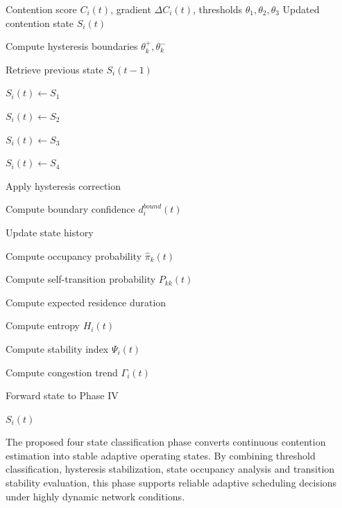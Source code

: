 \documentclass[a4paper,fleqn,final,1p]{cas-dc}
\numberwithin{equation}{section}
\begin{document}
\begin{algorithm}[H]
\caption{Phase III: Contention State Classification}
\label{alg:phase3}
\begin{algorithmic}[1]

\Require Contention score $C_i(t)$, gradient $\Delta C_i(t)$, thresholds $\theta_1,\theta_2,\theta_3$
\Ensure Updated contention state $S_i(t)$

\State Compute hysteresis boundaries $\theta_k^{+}, \theta_k^{-}$

\State Retrieve previous state $S_i(t-1)$


\State $S_i(t) \gets S_1$


\State $S_i(t) \gets S_2$


\State $S_i(t) \gets S_3$

\Else

\State $S_i(t) \gets S_4$

\EndIf

\State Apply hysteresis correction

\State Compute boundary confidence $d_i^{bound}(t)$

\State Update state history


\State Compute occupancy probability $\hat{\pi}_k(t)$

\State Compute self-transition probability $P_{kk}(t)$

\EndFor


\State Compute expected residence duration

\State Compute entropy $H_i(t)$

\State Compute stability index $\Psi_i(t)$

\State Compute congestion trend $\Gamma_i(t)$

\State Forward state to Phase IV

\State \Return $S_i(t)$

\end{algorithmic}
\end{algorithm}

The proposed four state classification phase converts continuous contention estimation into stable adaptive operating states. By combining threshold classification, hysteresis stabilization, state occupancy analysis and transition stability evaluation, this phase supports reliable adaptive scheduling decisions under highly dynamic network conditions.
\end{document}
